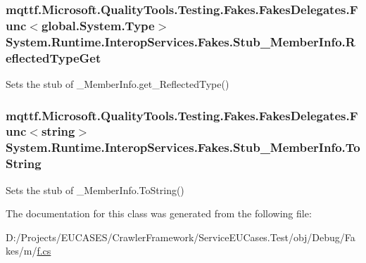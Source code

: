 \hypertarget{class_system_1_1_runtime_1_1_interop_services_1_1_fakes_1_1_stub___member_info_a3e0c1050a266991d26ed59f18cc70673}{
\subsubsection[{Reflected\-Type\-Get}]{\setlength{\rightskip}{0pt plus 5cm}mqttf.\-Microsoft.\-Quality\-Tools.\-Testing.\-Fakes.\-Fakes\-Delegates.\-Func$<$global.\-System.\-Type$>$ System.\-Runtime.\-Interop\-Services.\-Fakes.\-Stub\-\_\-\-Member\-Info.\-Reflected\-Type\-Get}}\label{class_system_1_1_runtime_1_1_interop_services_1_1_fakes_1_1_stub___member_info_a3e0c1050a266991d26ed59f18cc70673}


Sets the stub of \-\_\-\-Member\-Info.\-get\-\_\-\-Reflected\-Type()

\hypertarget{class_system_1_1_runtime_1_1_interop_services_1_1_fakes_1_1_stub___member_info_a590202ae401500308dd406357b7edaa5}{
\subsubsection[{To\-String}]{\setlength{\rightskip}{0pt plus 5cm}mqttf.\-Microsoft.\-Quality\-Tools.\-Testing.\-Fakes.\-Fakes\-Delegates.\-Func$<$string$>$ System.\-Runtime.\-Interop\-Services.\-Fakes.\-Stub\-\_\-\-Member\-Info.\-To\-String}}\label{class_system_1_1_runtime_1_1_interop_services_1_1_fakes_1_1_stub___member_info_a590202ae401500308dd406357b7edaa5}


Sets the stub of \-\_\-\-Member\-Info.\-To\-String()



The documentation for this class was generated from the following file\-:\begin{DoxyCompactItemize}
\item 
D\-:/\-Projects/\-E\-U\-C\-A\-S\-E\-S/\-Crawler\-Framework/\-Service\-E\-U\-Cases.\-Test/obj/\-Debug/\-Fakes/m/\hyperlink{m_2f_8cs}{f.\-cs}\end{DoxyCompactItemize}
